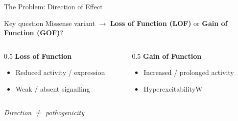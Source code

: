 \documentclass[aspectratio=169]{beamer}
\begin{document}
\begin{frame}{The Problem: Direction of Effect}
\begin{block}{Key question}
Missense variant $\rightarrow$ \textcolor{lofcolor}{\textbf{Loss of Function (LOF)}}
or \textcolor{gofcolor}{\textbf{Gain of Function (GOF)}}?
\end{block}
\vspace{0.3cm}
\begin{columns}[T]
\begin{column}{0.5\textwidth}
\centering
\textcolor{lofcolor}{\textbf{Loss of Function}}
\begin{itemize}\setlength\itemsep{0.5em}
  \item Reduced activity / expression
  \item Weak / absent signalling
\end{itemize}
\end{column}
\begin{column}{0.5\textwidth}
\centering
\textcolor{gofcolor}{\textbf{Gain of Function}}
\begin{itemize}\setlength\itemsep{0.5em}
  \item Increased / prolonged activity
  \item HyperexcitabilityW
\end{itemize}
\end{column}
\end{columns}
\vspace{0.35cm}
\begin{center}
\emph{Direction $\neq$ pathogenicity}
\end{center}
\end{frame}
\end{document}
